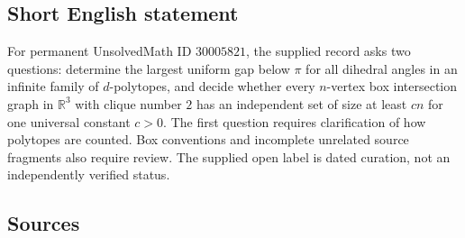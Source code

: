 \documentclass[11pt]{article}
\newcommand{\R}{\mathbb{R}}
\begin{document}
\subsection{Short English statement}
For permanent UnsolvedMath ID \(30005821\), the supplied record asks two questions: determine the largest uniform gap below \(\pi\) for all dihedral angles in an infinite family of \(d\)-polytopes, and decide whether every \(n\)-vertex box intersection graph in \(\R^3\) with clique number \(2\) has an independent set of size at least \(cn\) for one universal constant \(c>0\). The first question requires clarification of how polytopes are counted. Box conventions and incomplete unrelated source fragments also require review. The supplied open label is dated curation, not an independently verified status.
\subsection{Sources}
\end{document}
